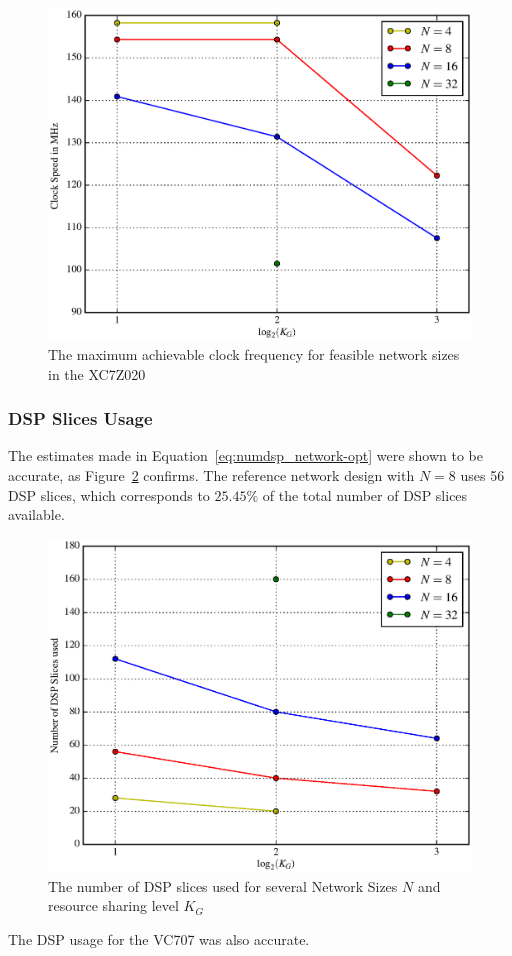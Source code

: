 \documentclass[conference]{IEEEtran}
\begin{document}
\begin{figure}
    \centering
    \includegraphics[width=\linewidth]{figures/maxfreq.eps}
    \caption{The maximum achievable clock frequency for feasible network sizes in the XC7Z020}
    \label{fig:maxfreq}
\end{figure}

\subsubsection{DSP Slices Usage}\label{sec:results_synth_dsp}
The estimates made in Equation~\ref{eq:numdsp_network-opt} were shown to be accurate, as Figure~\ref{fig:dspused} confirms.
The reference network design with $N=8$ uses 56 DSP slices, which corresponds to $25.45\%$ of the total number of DSP slices available.

\begin{figure}
    \centering
    \includegraphics[width=\linewidth]{figures/dspuse.eps}
    \caption{The number of DSP slices used for several Network Sizes $N$ and resource sharing level $K_G$}
    \label{fig:dspused}
\end{figure}
The DSP usage for the VC707 was also accurate.
\end{document}
